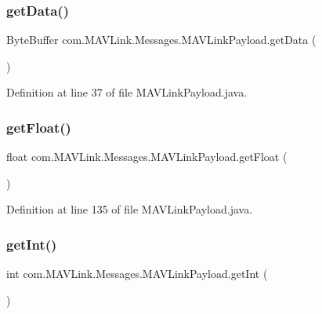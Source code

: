 \subsubsection{\texorpdfstring{getData()}{getData()}}
{\footnotesize\ttfamily Byte\+Buffer com.\+M\+A\+V\+Link.\+Messages.\+M\+A\+V\+Link\+Payload.\+get\+Data (\begin{DoxyParamCaption}{ }\end{DoxyParamCaption})\hspace{0.3cm}{\ttfamily [inline]}}



Definition at line 37 of file M\+A\+V\+Link\+Payload.\+java.

\mbox{\label{classcom_1_1MAVLink_1_1Messages_1_1MAVLinkPayload_a71ad35c623893d82ea833b04c1e4664e}} 
\subsubsection{\texorpdfstring{getFloat()}{getFloat()}}
{\footnotesize\ttfamily float com.\+M\+A\+V\+Link.\+Messages.\+M\+A\+V\+Link\+Payload.\+get\+Float (\begin{DoxyParamCaption}{ }\end{DoxyParamCaption})\hspace{0.3cm}{\ttfamily [inline]}}



Definition at line 135 of file M\+A\+V\+Link\+Payload.\+java.

\mbox{\label{classcom_1_1MAVLink_1_1Messages_1_1MAVLinkPayload_a2ad2d098118daf0b4ccb2661634da1e0}} 
\subsubsection{\texorpdfstring{getInt()}{getInt()}}
{\footnotesize\ttfamily int com.\+M\+A\+V\+Link.\+Messages.\+M\+A\+V\+Link\+Payload.\+get\+Int (\begin{DoxyParamCaption}{ }\end{DoxyParamCaption})\hspace{0.3cm}{\ttfamily [inline]}}



